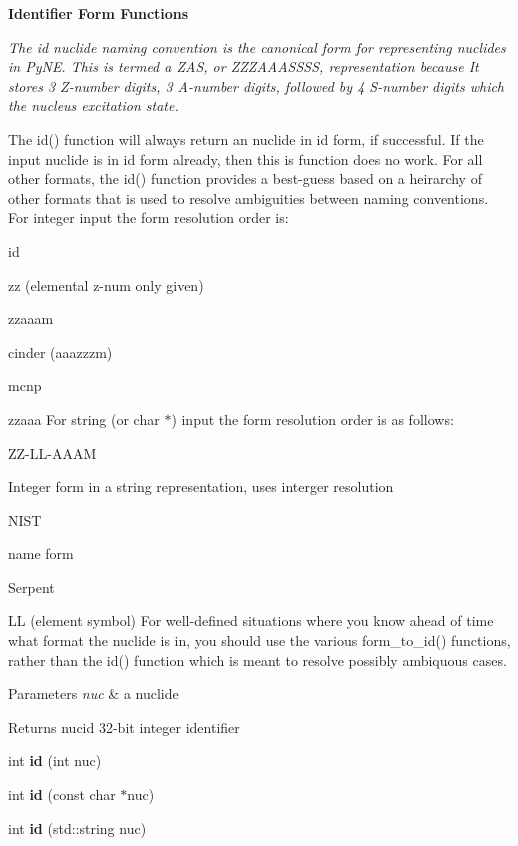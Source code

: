 \begin{Indent}\textbf{ Identifier Form Functions}\par
{\em The \textquotesingle{}id\textquotesingle{} nuclide naming convention is the canonical form for representing nuclides in Py\+NE. This is termed a Z\+AS, or Z\+Z\+Z\+A\+A\+A\+S\+S\+SS, representation because It stores 3 Z-\/number digits, 3 A-\/number digits, followed by 4 S-\/number digits which the nucleus excitation state.

The id() function will always return an nuclide in id form, if successful. If the input nuclide is in id form already, then this is function does no work. For all other formats, the id() function provides a best-\/guess based on a heirarchy of other formats that is used to resolve ambiguities between naming conventions. For integer input the form resolution order is\+:
\begin{DoxyItemize}
\item id
\item zz (elemental z-\/num only given)
\item zzaaam
\item cinder (aaazzzm)
\item mcnp
\item zzaaa For string (or char $\ast$) input the form resolution order is as follows\+:
\item Z\+Z-\/\+L\+L-\/\+A\+A\+AM
\item Integer form in a string representation, uses interger resolution
\item N\+I\+ST
\item name form
\item Serpent
\item LL (element symbol) For well-\/defined situations where you know ahead of time what format the nuclide is in, you should use the various form\+\_\+to\+\_\+id() functions, rather than the id() function which is meant to resolve possibly ambiquous cases. 
\begin{DoxyParams}{Parameters}
{\em nuc} & a nuclide \\
\hline
\end{DoxyParams}
\begin{DoxyReturn}{Returns}
nucid 32-\/bit integer identifier 
\end{DoxyReturn}

\end{DoxyItemize}}\begin{DoxyCompactItemize}
\item 
\mbox{\label{namespacepyne_1_1nucname_a179fb56293a25041720035d6ca7a56c5}} 
int {\bfseries id} (int nuc)
\item 
\mbox{\label{namespacepyne_1_1nucname_aeae6e6349d1ebe44ae449ce485070492}} 
int {\bfseries id} (const char $\ast$nuc)
\item 
\mbox{\label{namespacepyne_1_1nucname_aba028a16fcfaeb10e45bb5218606a17e}} 
int {\bfseries id} (std\+::string nuc)
\end{DoxyCompactItemize}
\end{Indent}
